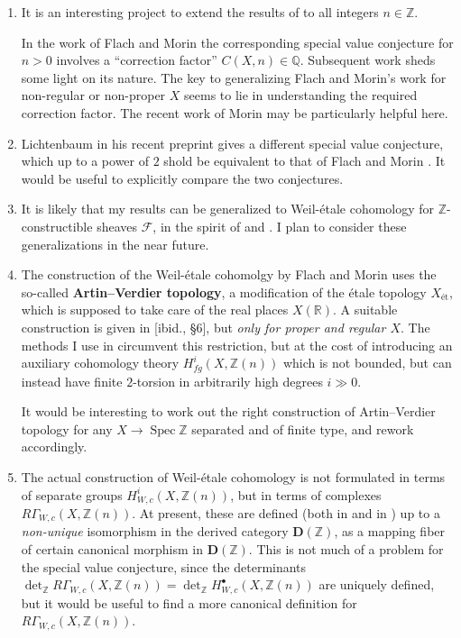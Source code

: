 \documentclass{article}
\DeclareMathOperator{\Spec}{Spec}
\newcommand{\ZZ}{\mathbb{Z}}
\newcommand{\QQ}{\mathbb{Q}}
\newcommand{\RR}{\mathbb{R}}
\begin{document}
\begin{enumerate}
\item It is an interesting project to extend the results of
  \cite{Weil-etale-1-dim} to all integers $n \in \ZZ$.

  In the work of Flach and Morin \cite{Flach-Morin-2018} the corresponding
  special value conjecture for $n > 0$ involves a ``correction factor''
  $C (X,n) \in \QQ$. Subsequent work
  \cite{Flach-Morin-2020,Flach-Morin-2020-Muenster} sheds some light on its
  nature. The key to generalizing Flach and Morin's work for non-regular or
  non-proper $X$ seems to lie in understanding the required correction
  factor. The recent work of Morin \cite{Morin-2021-THH} may be particularly
  helpful here.

\item Lichtenbaum in his recent preprint \cite{Lichtenbaum-2021} gives a
  different special value conjecture, which up to a power of $2$ shold be
  equivalent to that of Flach and Morin \cite{Flach-Morin-2018}. It would be
  useful to explicitly compare the two conjectures.

\item It is likely that my results can be generalized to Weil-étale cohomology
  for $\ZZ$-constructible sheaves $\mathcal{F}$, in the spirit of
  \cite{Geisser-Suzuki-2020} and \cite{Adrien-Morin-2021}. I plan to consider
  these generalizations in the near future.

\item The construction of the Weil-étale cohomolgy by Flach and Morin
  \cite{Flach-Morin-2018} uses the so-called \textbf{Artin--Verdier topology},
  a modification of the étale topology $X_\text{\'et}$, which is supposed to take
  care of the real places $X (\RR)$. A suitable construction is given in
  [ibid., \S 6], but \emph{only for proper and regular $X$}. The methods I use
  in \cite{Weil-etale-cohomology} circumvent this restriction, but at the cost
  of introducing an auxiliary cohomology theory $H^i_{fg} (X, \ZZ(n))$ which is
  not bounded, but can instead have finite $2$-torsion in arbitrarily high
  degrees $i \gg 0$.

  It would be interesting to work out the right construction of Artin--Verdier
  topology for any $X \to \Spec \ZZ$ separated and of finite type, and rework
  \cite{Weil-etale-cohomology} accordingly.

\item The actual construction of Weil-étale cohomology is not formulated in
  terms of separate groups $H^i_{W,c} (X, \ZZ (n))$, but in terms of complexes
  $R\Gamma_{W,c} (X, \ZZ (n))$. At present, these are defined (both in
  \cite{Flach-Morin-2018} and in \cite{Weil-etale-cohomology}) up to a
  \emph{non-unique} isomorphism in the derived category $\mathbf{D} (\ZZ)$, as a
  mapping fiber of certain canonical morphism in $\mathbf{D} (\ZZ)$. This is not
  much of a problem for the special value conjecture, since the determinants
  $\det_\ZZ R\Gamma_{W,c} (X, \ZZ (n)) = \det_\ZZ H^\bullet_{W,c} (X, \ZZ(n))$
  are uniquely defined, but it would be useful to find a more canonical
  definition for $R\Gamma_{W,c} (X, \ZZ (n))$.


\end{enumerate}
\end{document}
